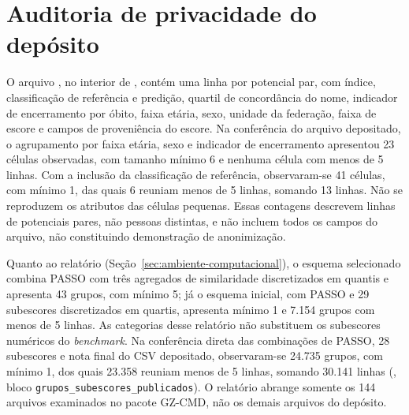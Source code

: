 \section{Auditoria de privacidade do depósito}\label{sec:ap-privacidade-deposito}

O arquivo , no interior de , contém uma linha por potencial par, com índice, classificação de referência e predição, quartil de concordância do nome, indicador de encerramento por óbito, faixa etária, sexo, unidade da federação, faixa de escore e campos de proveniência do escore. Na conferência do arquivo depositado, o agrupamento por faixa etária, sexo e indicador de encerramento apresentou 23 células observadas, com tamanho mínimo 6 e nenhuma célula com menos de 5 linhas. Com a inclusão da classificação de referência, observaram-se 41 células, com mínimo 1, das quais 6 reuniam menos de 5 linhas, somando 13 linhas. Não se reproduzem os atributos das células pequenas. Essas contagens descrevem linhas de potenciais pares, não pessoas distintas, e não incluem todos os campos do arquivo, não constituindo demonstração de anonimização.

Quanto ao relatório  (Seção~\ref{sec:ambiente-computacional}), o esquema selecionado combina PASSO com três agregados de similaridade discretizados em quantis e apresenta 43 grupos, com mínimo 5; já o esquema inicial, com PASSO e 29 subescores discretizados em quartis, apresenta mínimo 1 e 7.154 grupos com menos de 5 linhas. As categorias desse relatório não substituem os subescores numéricos do \textit{benchmark}. Na conferência direta das combinações de PASSO, 28 subescores e nota final do CSV depositado, observaram-se 24.735 grupos, com mínimo 1, dos quais 23.358 reuniam menos de 5 linhas, somando 30.141 linhas (, bloco \texttt{grupos\_subescores\_publicados}). O relatório  abrange somente os 144 arquivos examinados no pacote GZ-CMD, não os demais arquivos do depósito.
